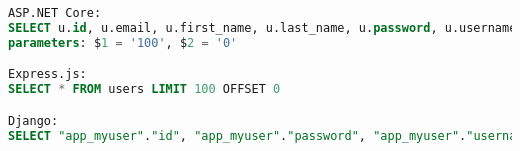 \begin{lstlisting}[language=SQL,caption={\acrshort{sql} commands for retrieving multiple objects},breaklines=true,label={lst:sqlGetMany}]
ASP.NET Core:
SELECT u.id, u.email, u.first_name, u.last_name, u.password, u.username FROM users AS u LIMIT $1 OFFSET $2
parameters: $1 = '100', $2 = '0'

Express.js:
SELECT * FROM users LIMIT 100 OFFSET 0

Django:
SELECT "app_myuser"."id", "app_myuser"."password", "app_myuser"."username", "app_myuser"."first_name", "app_myuser"."last_name", "app_myuser"."email" FROM "app_myuser" LIMIT 100
\end{lstlisting}

